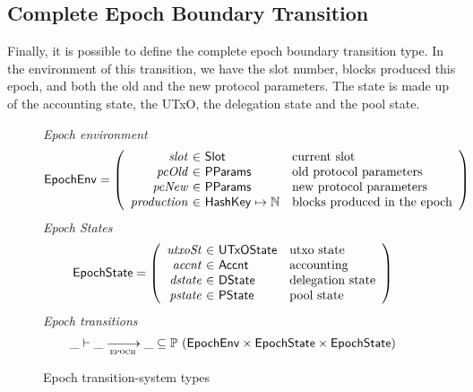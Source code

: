 \subsection{Complete Epoch Boundary Transition}
\label{sec:total-epoch}

Finally, it is possible to define the complete epoch boundary transition type.
In the environment of this transition, we have the slot number, blocks produced
this epoch, and both the old and the new protocol parameters. The state is
made up of the accounting state, the UTxO, the delegation state and the
pool state.

\begin{figure}[htb]
  \emph{Epoch environment}
  \begin{equation*}
    \EpochEnv =
    \left(
      \begin{array}{r@{~\in~}ll}
        \var{slot} & \Slot & \text{current slot}\\
        \var{pcOld} & \PParams & \text{old protocol parameters}\\
        \var{pcNew} & \PParams & \text{new protocol parameters}\\
        \var{production} & \HashKey \mapsto \mathbb{N} & \text{blocks produced in the epoch}\\
      \end{array}
    \right)
  \end{equation*}
  \emph{Epoch States}
  \begin{equation*}
    \EpochState =
    \left(
      \begin{array}{r@{~\in~}ll}
        \var{utxoSt} & \UTxOState & \text{utxo state}\\
        \var{accnt} & \Accnt & \text{accounting}\\
        \var{dstate} & \DState & \text{delegation state}\\
        \var{pstate} & \PState & \text{pool state}\\
      \end{array}
    \right)
  \end{equation*}
  \emph{Epoch transitions}
  \begin{equation*}
    \_ \vdash
    \var{\_} \trans{epoch}{} \var{\_}
    \subseteq \powerset (\EpochEnv \times \EpochState \times \EpochState)
  \end{equation*}
  \caption{Epoch transition-system types}
  \label{fig:ts-types:epoch}
\end{figure}


